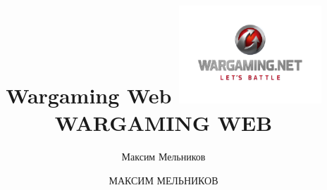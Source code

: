 \documentclass[aspectratio=169]{beamer}
\begin{document}
\title{Wargaming Web}
\author{Максим Мельников}
\date{}

{

\title{
    \includegraphics[width=0.4\textwidth]{wg-logo.png}\\
    {\Huge WARGAMING WEB}
}
\author{МАКСИМ МЕЛЬНИКОВ}

\begin{frame}[plain]{}
    \titlepage
\end{frame}

}

\end{document}
